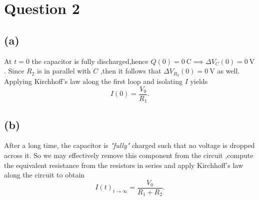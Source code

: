 \documentclass[
	12pt,
	]{article}
\theoremstyle{definition}
\theoremstyle{definition}
\theoremstyle{definition}
\theoremstyle{definition}
\theoremstyle{definition}
\theoremstyle{example}
\theoremstyle{note}
\theoremstyle{remark}
\theoremstyle{example}
\begin{document}
		\section*{Question 2}
			\subsection*{(a)}
				At $t=0$ the capacitor is fully discharged,hence $Q(0) = 0 \ \si{\coulomb} \implies \Delta V_{C}(0) = 0 \ \si{\volt}$. Since $R_{2}$ is in parallel with $C$ ,then it follows that $\Delta V_{R_{2}}(0) = 0 \ \si{\volt}$ as well. Applying Kirchhoff's law along the first loop and isolating $I$ yields 
				$$ I(0) = \frac{V_{0}}{R_{1}}.$$
			\subsection*{(b)}
				After a long  time, the capacitor is \textit{"fully"} charged such that no voltage is dropped across it. So we may effectively remove this component from the circuit ,compute the equivalent resistance from the resistors in series and apply Kirchhoff's law along the circuit to obtain 
				$$ I(t)_{t\to \infty} = \frac{V_{0}}{R_{1}+ R_{2}}.$$
\end{document}
